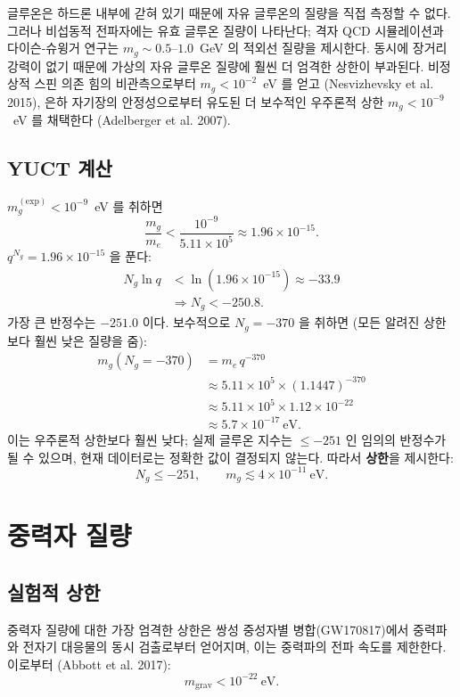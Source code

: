\documentclass[11pt,a4paper]{article}
\begin{document}
	글루온은 하드론 내부에 갇혀 있기 때문에 자유 글루온의 질량을 직접 측정할 수 없다. 그러나 비섭동적 전파자에는 유효 글루온 질량이 나타난다; 격자 QCD 시뮬레이션과 다이슨-슈윙거 연구는 $m_g \sim 0.5$–$1.0$~GeV 의 적외선 질량을 제시한다. 동시에 장거리 강력이 없기 때문에 가상의 자유 글루온 질량에 훨씬 더 엄격한 상한이 부과된다. 비정상적 스핀 의존 힘의 비관측으로부터 $m_g < 10^{-2}$~eV 를 얻고 (Nesvizhevsky et al. 2015), 은하 자기장의 안정성으로부터 유도된 더 보수적인 우주론적 상한 $m_g < 10^{-9}$~eV 를 채택한다 (Adelberger et al. 2007).
	
	\subsection{YUCT 계산}
	
	$m_g^{\mathrm{(exp)}} < 10^{-9}$~eV 를 취하면
	\[
	\frac{m_g}{m_e} < \frac{10^{-9}}{5.11\times10^5} \approx 1.96\times 10^{-15}.
	\]
	$q^{N_g} = 1.96\times10^{-15}$ 을 푼다:
	\[
	\begin{aligned}
		N_g \ln q &< \ln(1.96\times10^{-15}) \approx -33.9 \\
		&\Longrightarrow N_g < -250.8 .
	\end{aligned}
	\]
	가장 큰 반정수는 $-251.0$ 이다. 보수적으로 $N_g = -370$ 을 취하면 (모든 알려진 상한보다 훨씬 낮은 질량을 줌):
	\[
	\begin{aligned}
		m_g(N_g = -370) &= m_e \, q^{-370} \\
		&\approx 5.11\times10^5 \times (1.1447)^{-370} \\
		&\approx 5.11\times10^5 \times 1.12\times10^{-22} \\
		&\approx 5.7 \times 10^{-17}~\mathrm{eV}.
	\end{aligned}
	\]
	이는 우주론적 상한보다 훨씬 낮다; 실제 글루온 지수는 $\le -251$ 인 임의의 반정수가 될 수 있으며, 현재 데이터로는 정확한 값이 결정되지 않는다. 따라서 \textbf{상한}을 제시한다:
	\[
	\boxed{N_g \le -251}, \qquad
	\boxed{m_g \lesssim 4 \times 10^{-11}~\mathrm{eV}} .
	\]
	
	\section{중력자 질량}
	
	\subsection{실험적 상한}
	
	중력자 질량에 대한 가장 엄격한 상한은 쌍성 중성자별 병합(GW170817)에서 중력파와 전자기 대응물의 동시 검출로부터 얻어지며, 이는 중력파의 전파 속도를 제한한다. 이로부터 (Abbott et al. 2017):
	\[
	m_{\mathrm{grav}} < 10^{-22}~\mathrm{eV}.
	\]
	
\end{document}
